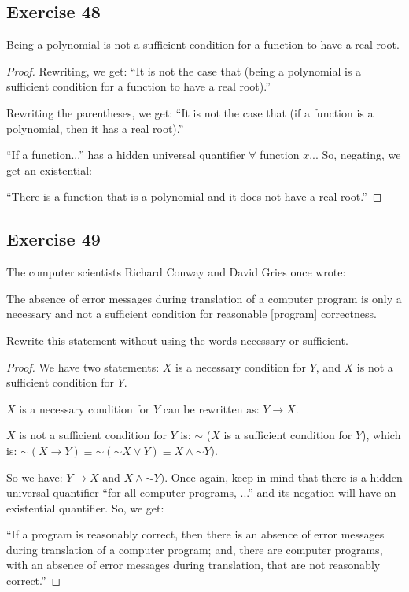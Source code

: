 \documentclass[14pt]{extarticle}
\newcommand{\fa}{\forall}
\begin{document}
\subsection{Exercise 48}
Being a polynomial is not a sufficient condition for a function to have a real root.

\begin{proof}
Rewriting, we get: ``It is not the case that (being a polynomial is a sufficient condition for a function to have a real root).''

Rewriting the parentheses, we get: ``It is not the case that (if a function is a polynomial, then it has a real root).''

``If a function...'' has a hidden universal quantifier $\fa$ function $x$... So, negating, we get an existential: 

``There is a function that is a polynomial and it does not have a real root.''
\end{proof}

\subsection{Exercise 49}
The computer scientists Richard Conway and David Gries once wrote:

The absence of error messages during translation of a computer program is only a necessary and not a sufficient condition for reasonable [program] correctness.

Rewrite this statement without using the words necessary or sufficient.

\begin{proof}
We have two statements: $X$ is a necessary condition for $Y$, and $X$ is not a sufficient condition for $Y$.

$X$ is a necessary condition for $Y$ can be rewritten as: $Y \to X$.

$X$ is not a sufficient condition for $Y$ is: $\sim$ ($X$ is a sufficient condition for $Y$), which is: ${\sim (X \to Y)} \equiv {\sim({\sim X} \vee Y)} \equiv X \wedge {\sim Y})$.

So we have: $Y \to X$ and $X \wedge {\sim Y})$. Once again, keep in mind that there is a hidden universal quantifier ``for all computer programs, ...'' and its negation will have an existential quantifier. So, we get:

``If a program is reasonably correct, then there is an absence of error messages during translation of a computer program; and, there are computer programs, with an absence of error messages during translation, that are not reasonably correct.''
\end{proof}
\end{document}
